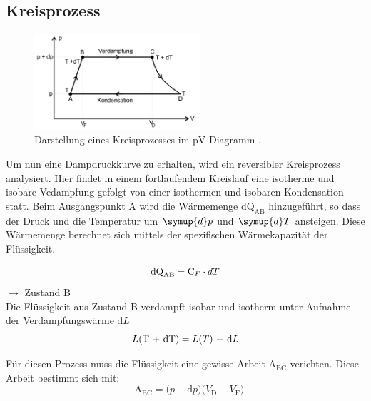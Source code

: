 \subsection{Kreisprozess}

\begin{figure}[H]
    \centering
    \includegraphics[width=0.55\textwidth]{images/Kreislauf.PNG}
    \caption{Darstellung eines Kreisprozesses im pV-Diagramm \protect \cite{V203}.}
    \label{img:Kreislauf}
\end{figure}

\noindent Um nun eine Dampdruckkurve zu erhalten, wird ein reversibler Kreisprozess analysiert. Hier findet in einem fortlaufendem 
Kreislauf eine isotherme und isobare Vedampfung gefolgt von einer isothermen und isobaren Kondensation statt.
Beim Ausgangspunkt A wird die Wärmemenge $\text{dQ}_\text{AB} $ hinzugeführt, so dass der Druck und die Temperatur um $\symup{d}p$ und $\symup{d}T$ ansteigen.
Diese Wärmemenge berechnet sich mittels der spezifischen Wärmekapazität der Flüssigkeit.

\begin{equation}
    \text{dQ}_\text{AB}= \text{C}_F \cdot dT \nonumber\\
\end{equation}
$\rightarrow$ Zustand B\\

\noindent Die Flüssigkeit aus Zustand B verdampft isobar und isotherm unter Aufnahme der Verdampfungswärme d$L$\\

\begin{equation}
L\text{(T + dT)} = L\text{(}T\text{) + d}L\nonumber\\
\end{equation}

\noindent Für diesen Prozess muss die Flüssigkeit eine gewisse Arbeit $\text{A}_\text{BC}$ verichten. Diese Arbeit bestimmt sich mit:\\

\begin{equation}
   - \text{A}_\text{BC} = \text{(}p + \text{d}p\text{)(}V_\text{D} - V_\text{F}\text{)} \nonumber
\end{equation}

